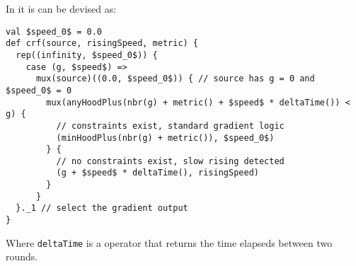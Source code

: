 In \scafi{} it is can be devised as:
\begin{lstlisting}[mathescape]
val $speed_0$ = 0.0
def crf(source, risingSpeed, metric) {
  rep((infinity, $speed_0$)) {
    case (g, $speed$) => 
      mux(source)((0.0, $speed_0$)) { // source has g = 0 and $speed_0$ = 0
        mux(anyHoodPlus(nbr(g) + metric() + $speed$ * deltaTime()) < g) {
          // constraints exist, standard gradient logic
          (minHoodPlus(nbr(g) + metric()), $speed_0$)
        } {
          // no constraints exist, slow rising detected
          (g + $speed$ * deltaTime(), risingSpeed)
        }
      }
  }._1 // select the gradient output
}
\end{lstlisting}
Where \lstinline|deltaTime| is a \scafi{} operator that returns the time elapseds between two rounds.